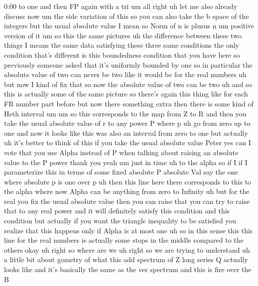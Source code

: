 \begin{unfinished}{0:00}
to
one  and
then  FP  again  with  a
tri
um  all  right  uh
let  me  also  already  discuss  now  um  the
side  variation  of  this  so  you  can  also
take  the  b  space  of  the  integers  but  the
usual  absolute
value  I  mean
so  Norm  of  n
is  plusus  n
um  positive  version  of  it
um  so  this  the  same  pictures  uh
the  difference  between  these  two  things
I  means  the  same  data  satisfying  these
three  same  conditions  the  only  condition
that's  different  is  this  boundedness
condition  that  you  have  here  so
previously  someone  asked  that  it's
uniformly  bounded  by  one  so  in
particular  the  absolute  value  of  two  can
never  be  two  like  it  would  be  for  the
real  numbers  uh  but  now  I  kind  of  fix
that  so  now  the  absolute  value  of  two
can  be  two  uh  and  so  this  is  actually
some  of  the  same  picture  so  there's
again  this  thing  like  for  each  FR  number
part
before  but  now  there  something
extra  then  there  is  some  kind  of  Heth
interval
um  um  so  this  corresponds
to  the  map  from  Z  to  R  and  then  you  take
the  usual  absolute  value  of  r  to  any
power
P  where
p
uh  go  from  zero  up  to
one  and  now  it  looks  like  this  was  also
an  interval  from  zero  to  one  but
actually  uh  it's  better  to  think  of
this  if  you  take  the  usual  absolute
value  Peter  yes  can  I  vote  that  you  use
Alpha  instead  of  P  when  talking  about
raising  an  absolute  value  to  the  P  power
thank  you
yeah
um  just  in
time  uh  to  the  alpha  so  if  I  if  I
parameterize  this  in  terms  of  some  fixed
absolute  P  absolute  Val  say  the  one
where  absolute  p  is  one  over  p  uh  then
this  line  here  there  corresponds  to  this
to  the  alpha  where  now  Alpha  can  be
anything  from  zero  to
Infinity  uh  but  for  the  real  you  fix  the
usual  absolute
value  then  you  can  raise  that  you  can
try  to  raise  that  to  any  real  power  and
it  will  definitely  satisfy  this
condition  and  this  condition  but
actually  if  you  want  the  triangle
inequality  to  be  satisfied  you  realize
that  this  happens  only  if  Alpha  is  at
most  one  uh  so  in  this  sense  this  this
line  for  the  real
numbers  is  actually  some  stops  in  the
middle  compared  to  the
others
okay  uh  right
so  where  are
we  uh  right  so  we  are  trying  to
understand  uh  a  little  bit  about  gometry
of  what  this  add  spectrum  of  Z  long
series  Q  actually  looks
like  and  it's  basically  the  same  as  the
ver  spectrum  and  this  is  fire  over  the  B

\end{unfinished}
